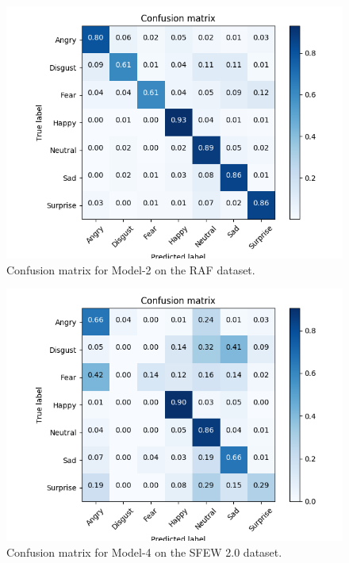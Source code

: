 \documentclass[10pt,twocolumn,letterpaper]{article}
\begin{document}
			\begin{figure}[ht]
					\begin{center}
						\rule{0pt}{.2in}
							\includegraphics[width=.95\linewidth,keepaspectratio]{res/cm}
					\end{center}
					\caption{Confusion matrix for Model-2 on the RAF dataset.}
					\label{fig:cm_raf}
				\end{figure}
				\begin{figure}
					\begin{center}
						\includegraphics[width=.95\linewidth,keepaspectratio]{res/cm_sfew}	
					\end{center}
					\caption{Confusion matrix for Model-4 on the SFEW 2.0 dataset.}
					\label{fig:cm_sfew}
				\end{figure}
		
\end{document}
